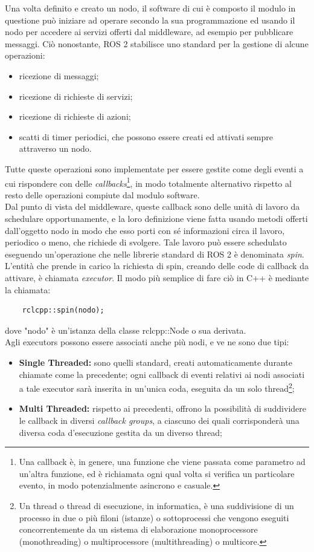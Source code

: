 \indent Una volta definito e creato un nodo, il software di cui è composto il modulo in questione può iniziare ad operare secondo la sua programmazione ed usando il nodo per accedere ai servizi offerti dal middleware, ad esempio per pubblicare messaggi. Ciò nonostante, ROS 2 stabilisce uno standard per la gestione di alcune operazioni:
\begin{itemize}
    \item ricezione di messaggi;
    \item ricezione di richieste di servizi;
    \item ricezione di richieste di azioni;
    \item scatti di timer periodici, che possono essere creati ed attivati sempre attraverso un nodo.
\end{itemize}
Tutte queste operazioni sono implementate per essere gestite come degli eventi a cui rispondere con delle \emph{callbacks}\footnote{Una callback è, in genere, una funzione che viene passata come parametro ad un'altra funzione, ed è richiamata ogni qual volta si verifica un particolare evento, in modo potenzialmente asincrono e casuale.}, in modo totalmente alternativo rispetto al resto delle operazioni compiute dal modulo software.\\
Dal punto di vista del middleware, queste callback sono delle unità di lavoro da schedulare opportunamente, e la loro definizione viene fatta usando metodi offerti dall'oggetto nodo in modo che esso porti con sé informazioni circa il lavoro, periodico o meno, che richiede di svolgere. Tale lavoro può essere schedulato eseguendo un'operazione che nelle librerie standard di ROS 2 è denominata \emph{spin}. L'entità che prende in carico la richiesta di spin, creando delle code di callback da attivare, è chiamata \emph{executor}. Il modo più semplice di fare ciò in C++ è mediante la chiamata:
\begin{verbatim}
    rclcpp::spin(nodo);
\end{verbatim}
dove "nodo" è un'istanza della classe rclcpp::Node o sua derivata.\\
Agli executors possono essere associati anche più nodi, e ve ne sono due tipi:
\begin{itemize}
    \item \textbf{Single Threaded:} sono quelli standard, creati automaticamente durante chiamate come la precedente; ogni callback di eventi relativi ai nodi associati a tale executor sarà inserita in un'unica coda, eseguita da un solo thread\footnote{Un thread o thread di esecuzione, in informatica, è una suddivisione di un processo in due o più filoni (istanze) o sottoprocessi che vengono eseguiti concorrentemente da un sistema di elaborazione monoprocessore (monothreading) o multiprocessore (multithreading) o multicore.};
    \item \textbf{Multi Threaded:} rispetto ai precedenti, offrono la possibilità di suddividere le callback in diversi \emph{callback groups}, a ciascuno dei quali corrisponderà una diversa coda d'esecuzione gestita da un diverso thread;
\end{itemize}
